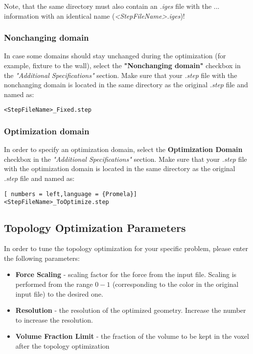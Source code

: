 \documentclass[
12pt, %
a4paper, %
oneside, %
headinclude,footinclude, %
BCOR5mm, %
]{scrartcl}
\begin{document}
Note, that the same directory must also contain an \textit{.iges} file with the ... information with an identical name (\textit{<StepFileName>.iges})! 

\subsubsection{Nonchanging domain}
In case some domains should stay unchanged during the optimization (for example, fixture to the wall), select the \textbf{"Nonchanging domain"} checkbox in the \textit{"Additional Specifications"} section. Make sure that your \textit{.step} file with the nonchanging domain is located in the same directory as the original \textit{.step} file and named as:
\begin{lstlisting}[language = {Promela}]
<StepFileName>_Fixed.step
\end{lstlisting}

\subsubsection{Optimization domain}
In order to specify an optimization domain, select the \textbf{Optimization Domain} checkbox in the \textit{"Additional Specifications"} section. Make sure that your \textit{.step} file with the optimization domain is located in the same directory as the original \textit{.step} file and named as:
\begin{lstlisting}[ numbers = left,language = {Promela}]
<StepFileName>_ToOptimize.step
\end{lstlisting}
\subsection{Topology Optimization Parameters}
In order to tune the topology optimization for your specific problem, please enter the following parameters:
\begin{itemize}
\item \textbf{Force Scaling} - scaling factor for the force from the input file. Scaling is performed from the range $0 - 1$ (corresponding to the color in the original input file) to the desired one.
\item \textbf{Resolution} - the resolution of the optimized geometry. Increase the number to increase the resolution.
\item \textbf{Volume Fraction Limit} - the fraction of the volume to be kept in the voxel after the topology optimization
\end{itemize}
\end{document}
